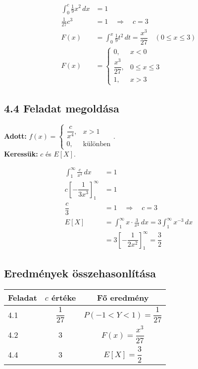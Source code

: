 \documentclass[a4paper, 12pt]{article}
\begin{document}
\begin{align*}
    \int_0^c \frac{1}{9}x^2 \, dx &= 1 \\
    \frac{1}{27}c^3 &= 1 \quad \Rightarrow \quad \boxed{c = 3} \\
    F(x) &= \int_0^x \frac{1}{9}t^2 \, dt = \dfrac{x^3}{27} \quad (0 \leq x \leq 3) \\
    F(x) &= \begin{cases}
        0, & x < 0 \\
        \dfrac{x^3}{27}, & 0 \leq x \leq 3 \\
        1, & x > 3
    \end{cases}
\end{align*}

\subsection*{4.4 Feladat megoldása}
\textbf{Adott:} \( f(x) = \begin{cases} \dfrac{c}{x^4}, & x > 1 \\ 0, & \text{különben} \end{cases} \).\\
\textbf{Keressük:} \( c \) és \( E[X] \).

\begin{align*}
    \int_1^\infty \frac{c}{x^4} \, dx &= 1 \\
    c \left[ -\dfrac{1}{3x^3} \right]_1^\infty &= 1 \\
    \dfrac{c}{3} &= 1 \quad \Rightarrow \quad \boxed{c = 3} \\
    E[X] &= \int_1^\infty x \cdot \frac{3}{x^4} \, dx = 3 \int_1^\infty x^{-3} \, dx \\
    &= 3 \left[ -\dfrac{1}{2x^2} \right]_1^\infty = \boxed{\dfrac{3}{2}}
\end{align*}

\subsection*{Eredmények összehasonlítása}
\begin{center}
    \begin{tabular}{|l|c|c|}
    \hline
    Feladat & \( c \) értéke & Fő eredmény \\ \hline
    4.1 & \( \dfrac{1}{27} \) & \( P(-1<Y<1) = \dfrac{1}{27} \) \\ \hline
    4.2 & 3 & \( F(x) = \dfrac{x^3}{27} \) \\ \hline
    4.4 & 3 & \( E[X] = \dfrac{3}{2} \) \\ \hline
    \end{tabular}
\end{center}

\end{document}
